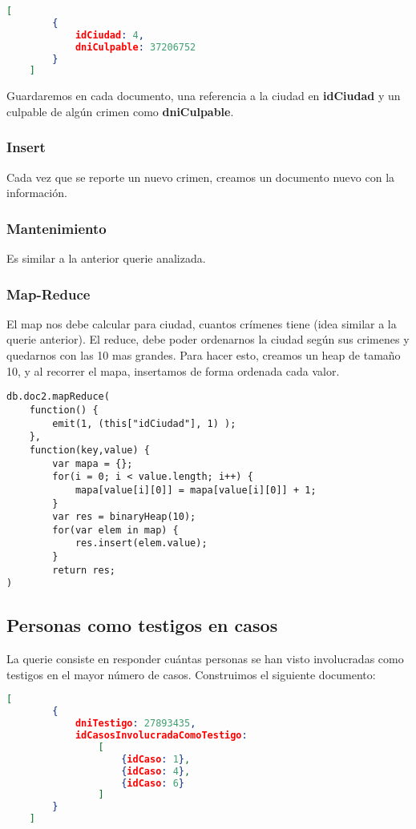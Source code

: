 \documentclass[11pt, a4paper]{article}
\begin{document}
\begin{lstlisting}[language=json]
	[
		{
			idCiudad: 4,
			dniCulpable: 37206752
		}
	]
\end{lstlisting}

Guardaremos en cada documento,  una referencia a la ciudad en \textbf{idCiudad} y un culpable de alg\'un crimen como \textbf{dniCulpable}.

\subsubsection{Insert}

Cada vez que se reporte un nuevo crimen, creamos un documento nuevo con la informaci\'on.

\subsubsection{Mantenimiento}

Es similar a la anterior querie analizada.

\subsubsection{Map-Reduce}

El map nos debe calcular para ciudad, cuantos cr\'imenes tiene (idea similar a la querie anterior). El reduce, debe poder ordenarnos la ciudad seg\'un sus crimenes y quedarnos con las 10 mas grandes. Para hacer esto, creamos un heap de tamaño 10, y al recorrer el mapa, insertamos de forma ordenada cada valor.
\begin{lstlisting}
db.doc2.mapReduce(
    function() {
        emit(1, (this["idCiudad"], 1) );
    },
    function(key,value) { 
        var mapa = {};
        for(i = 0; i < value.length; i++) {
            mapa[value[i][0]] = mapa[value[i][0]] + 1;
        }
        var res = binaryHeap(10);
        for(var elem in map) {
        	res.insert(elem.value);
        }
        return res;
)
\end{lstlisting}
\subsection{Personas como testigos en casos}

La querie consiste en responder cuántas personas se han visto involucradas como testigos en el mayor número de casos. Construimos el siguiente documento:

\begin{lstlisting}[language=json]
	[
		{
			dniTestigo: 27893435,
			idCasosInvolucradaComoTestigo:
				[
					{idCaso: 1},
					{idCaso: 4},
					{idCaso: 6}
				]
		}
	]
\end{lstlisting}
\end{document}
